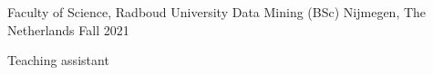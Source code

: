 \begin{cventries}
  \cventry
    {Faculty of Science, Radboud University} %
    {Data Mining (BSc)} %
    {Nijmegen, The Netherlands} %
    {Fall 2021} %
    {
      \begin{cvitems} %
        \item {Teaching assistant}
      \end{cvitems}
    }

\end{cventries}
